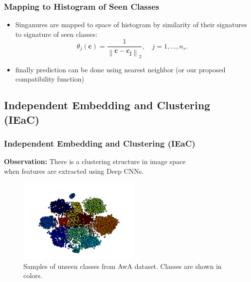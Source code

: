 \documentclass{beamer}
\newcommand{\norm}[1]{\left \lVert #1 \right \rVert}
\begin{document}
\begin{frame} \frametitle{Mapping to Histogram of Seen Classes}
  \begin{itemize}
    \item Singanures are mapped to space of histogram by similarity of their signatures to signature of seen classes:
    \begin{equation}
   \theta_j(\mathbf{c}) = \frac{1}{\norm{\mathbf{c - c_j}}_2  }, \quad j=1,\ldots, n_s.
   \end{equation}
   \item finally prediction can be done using nearest neighbor (or our proposed compatibility function)
\end{itemize}
\end{frame}

%


\subsection{Independent Embedding and Clustering (IEaC)}
\label{sub:Custering and Linear Embedding}
\begin{frame}\frametitle{Independent Embedding and Clustering (IEaC)}
  \textbf{Observation:}  There is a clustering structure in image space \\
  when features are extracted using Deep CNNs.
  \begin{figure}
\includegraphics[width=6cm]{awa_clusters}
\caption{\scriptsize Samples of unseen classes from AwA dataset. Classes are shown in colors.}
  \end{figure}
\end{frame}
\end{document}
